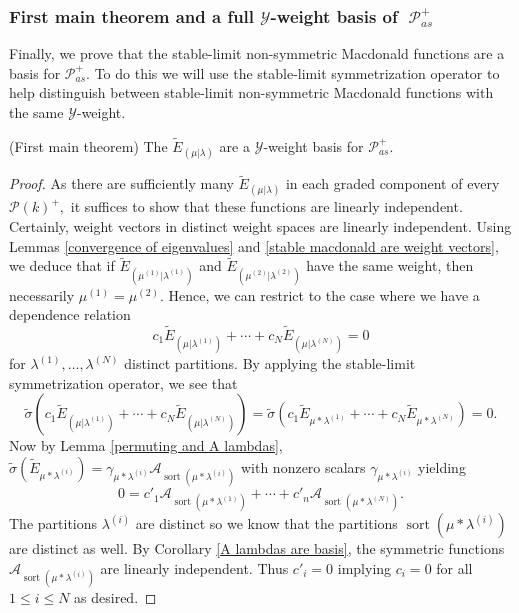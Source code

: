 \documentclass[ALCO,Unicode]{cedram}
\newcommand{\y}{{ \mathscr{Y} }}
\DeclareMathOperator{\sP}{\mathscr{P} }
\DeclareMathOperator{\sort}{sort}
\begin{document}
\subsubsection{First main theorem and a full $\y$-weight basis of $\sP_{as}^{+}$}

Finally, we prove that the stable-limit non-symmetric Macdonald functions are a basis for $\mathscr{P}_{as}^{+}$. To do this we will use the stable-limit symmetrization operator to help distinguish between stable-limit non-symmetric Macdonald functions with the same $\y$-weight. 

\begin{thm}(First main theorem) \label{main theorem}
The $\widetilde{E}_{(\mu|\lambda)}$ are a $\y$-weight basis for $\mathscr{P}_{as}^{+}$.
\end{thm}

\begin{proof}
As there are sufficiently many $\widetilde{E}_{(\mu|\lambda)}$ in each graded component of every $\mathscr{P}(k)^{+},$ it suffices to show that these functions are linearly independent. Certainly, weight vectors in distinct weight spaces are linearly independent. Using Lemmas \ref{convergence of eigenvalues} and \ref{stable macdonald are weight vectors}, we deduce that if $\widetilde{E}_{(\mu^{(1)}|\lambda^{(1)})}$ and $\widetilde{E}_{(\mu^{(2)}|\lambda^{(2)})}$ have the same weight, then necessarily $\mu^{(1)} = \mu^{(2)}$. Hence, we can restrict to the case where we
have a dependence relation
$$ c_1\widetilde{E}_{(\mu|\lambda^{(1)})} +\cdots + c_N \widetilde{E}_{(\mu|\lambda^{(N)})} = 0 $$
for $\lambda^{(1)},\ldots,\lambda^{(N)}$ distinct partitions.
By applying the stable-limit symmetrization operator, we see that 
$$ \widetilde{\sigma}(c_1\widetilde{E}_{(\mu|\lambda^{(1)})} +\cdots + c_N \widetilde{E}_{(\mu|\lambda^{(N)})} ) = \widetilde{\sigma}(c_1\widetilde{E}_{\mu*\lambda^{(1)}} +\cdots+c_N \widetilde{E}_{\mu*\lambda^{(N)}}) = 0 .$$
Now by Lemma \ref{permuting and A lambdas}, $\widetilde{\sigma}(\widetilde{E}_{\mu*\lambda^{(i)}}) = \gamma_{\mu*\lambda^{(i)}}  \mathcal{A}_{\sort(\mu*\lambda^{(i)})} $ with nonzero scalars  $\gamma_{\mu*\lambda^{(i)}}$ yielding 
$$ 0 = c'_1\mathcal{A}_{\sort(\mu*\lambda^{(1)})} +\cdots+ c'_n \mathcal{A}_{\sort(\mu*\lambda^{(N)})}.$$ The partitions $\lambda^{(i)}$ are distinct so we know that the partitions $\sort(\mu*\lambda^{(i)})$ are distinct as well. By Corollary \ref{A lambdas are basis}, the symmetric functions $\mathcal{A}_{\sort(\mu*\lambda^{(i)})}$ are linearly independent. Thus $c'_i = 0$ implying $c_i = 0$ for all $1 
\leq i \leq N$ as desired.
\end{proof}
\end{document}
